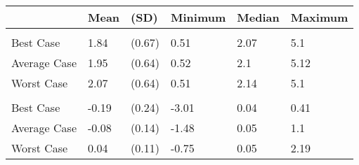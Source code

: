 
\begin{tabular}[t]{llllll}
\toprule
 & Mean & (SD) & Minimum & Median & Maximum\\
\midrule
\addlinespace[0.3em]
\multicolumn{6}{l}{\textbf{Prices}}\\
\hspace{1em}Best Case & 1.84 & (0.67) & 0.51 & 2.07 & 5.1\\
\hspace{1em}Average Case & 1.95 & (0.64) & 0.52 & 2.1 & 5.12\\
\hspace{1em}Worst Case & 2.07 & (0.64) & 0.51 & 2.14 & 5.1\\
\addlinespace[0.3em]
\multicolumn{6}{l}{\textbf{Price Change}}\\
\hspace{1em}Best Case & -0.19 & (0.24) & -3.01 & 0.04 & 0.41\\
\hspace{1em}Average Case & -0.08 & (0.14) & -1.48 & 0.05 & 1.1\\
\hspace{1em}Worst Case & 0.04 & (0.11) & -0.75 & 0.05 & 2.19\\
\bottomrule
\end{tabular}
